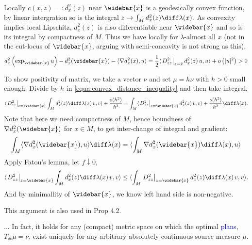 Locally $c(x,z)=:d^2_x(z)$ near $\widebar{x}$ is a geodesically convex function, by linear intergration so is the integral  \( z \mapsto \int _ { M } d^2_x(z) \diff \lambda ( x ) \).
As convexity implies local Lipschitz, $d^2_x(z)$ is also differentiable near $\widebar{x}$ and so is its integral by compactness of $M$.
Thus we have locally for $\lambda$-almost all $x$ (not in the cut-locus of $\widebar{x}$, arguing with semi-concavity is not strong as this),
\begin{equation}
	\label{equa:convex_distance_inequality}
	d^2_x \left( \exp _ {\widebar{x}} u \right) - d^2_x (\widebar{x}) - \langle \nabla d^2_x (\bar{x}) , u \rangle = \frac { 1 } { 2 } \langle \left. D _ { z z } ^ { 2 } \right| _ { z = \bar { x } } d^2_x(z) \, u , u \rangle + o \left( | u | ^ { 2 } \right) > 0
\end{equation}

To show positivity of matrix, we take a vector $\nu$ and set $\mu = h \nu$ with $h > 0$ small enough.
Divide by $h$ in \cref{equa:convex_distance_inequality} and then take integral,
\[
	\langle \left. D _ { z z } ^ { 2 } \right| _ { z = \widebar { x } } \int_{M} d^2_x(z) \diff \lambda ( x )\, v , v \rangle + \frac{o (h^2)}{h^2} = \int_{M} \langle \left. D _ { z z } ^ { 2 } \right| _ { z = \widebar { x } } d^2_x(z)\, v , v \rangle + \frac{o (h^2)}{h^2} \diff \lambda ( x ).
\]
Note that here we need compactness of $M$, hence boundness of $ \nabla d^2_x(\widebar{x}) $ for $x \in M$, to get inter-change of integral and gradient:
\[
	\int_M \langle \nabla d^2_x (\widebar{x}) , u \rangle \diff \lambda (x) = \langle \int_M \nabla d^2_x (\widebar{x}) \diff \lambda (x) , u \rangle
\]
Apply Fatou's lemma, let $f\downarrow 0$,
\[
	\langle \left. D _ { z z } ^ { 2 } \right| _ { z = \widebar { x } } \int_{M} d^2_x(z) \diff \lambda ( x )\, v , v \rangle \leq \langle \int_{M} \left. D _ { z z } ^ { 2 } \right| _ { z = \widebar { x } } d^2_x(z) \diff \lambda(x)\, v, v \rangle.
\]
And by minimallity of $\widebar{x}$, we know left hand side is non-negative.

This argument is also used in Prop 4.2.

\begin{rmk}[Remark 3.2]
	... In fact, it holds for any (compact) metric
	space on which the optimal  \textcolor{blue}{plans}, \( T _ { \# } \mu = \nu \), exist uniquely for any arbitrary absolutely continuous source measure \( \mu \).
\end{rmk}

